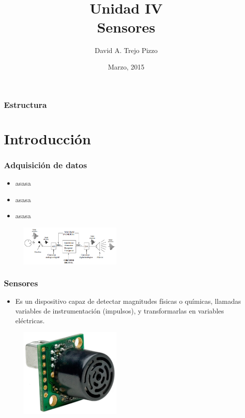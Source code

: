 \documentclass{beamer}
\title[Seminario de tecnologia]{Unidad IV\\ Sensores}
\author{David A. Trejo Pizzo}
\institute[Instituto Multimedial Da Vinci]
{Departamento de sistemas\\
\medskip
\textit{dtrejopizzo@gmail.com}}
\date{Marzo, 2015}
\begin{document}
\begin{frame}
\titlepage
\end{frame}


\begin{frame}
\frametitle{Estructura}
\tableofcontents
\end{frame}



\section{Introducción}

\begin{frame}
\frametitle{Adquisición de datos}
\begin{itemize}
\item asasa
\item asasa
\item asasa
\end{itemize}
\begin{figure}[!h]
\centering
\includegraphics[width=2in]{procmuestreo}
\end{figure}
\end{frame}

\begin{frame}
\frametitle{Sensores}
\begin{itemize}
\item Es un dispositivo capaz de detectar magnitudes físicas o químicas, llamadas variables de instrumentación (impulsos), y transformarlas en variables eléctricas.
\end{itemize}
\begin{figure}[!h]
\centering
\includegraphics[width=2in]{sensor}
\end{figure}
\end{frame}
\end{document}
